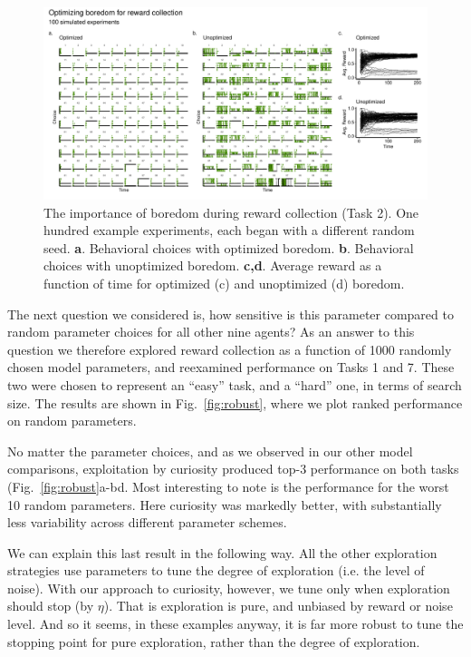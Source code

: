 \begin{figure}
	\begin{fullwidth}
	\includegraphics[width=1.0\linewidth]{img/boredom2.pdf} 
	\caption{The importance of boredom during reward collection (Task 2). One hundred example experiments, each began with a different random seed. 
	\textbf{a}. Behavioral choices with optimized boredom.
	\textbf{b}. Behavioral choices with unoptimized boredom.
	\textbf{c,d}. Average reward as a function of time for optimized (c) and unoptimized (d) boredom.
	}
	\label{fig:boredom2} 
	\end{fullwidth}
\end{figure}

The next question we considered is, how sensitive is this parameter compared to random parameter choices for all other nine agents? As an answer to this question we therefore explored reward collection as a function of 1000 randomly chosen model parameters, and reexamined performance on Tasks 1 and 7. These two were chosen to represent an ``easy'' task, and a ``hard'' one, in terms of search size. The results are shown in Fig.~\ref{fig:robust}, where we plot ranked performance on random parameters. 

No matter the parameter choices, and as we observed in our other model comparisons, exploitation by curiosity produced top-3 performance on both tasks (Fig.~\ref{fig:robust}a-bd. Most interesting to note is the performance for the worst 10 random parameters. Here curiosity was markedly better, with substantially less variability across different parameter schemes. 

We can explain this last result in the following way. All the other exploration strategies use parameters to tune the degree of exploration (i.e. the level of noise). With our approach to curiosity, however, we tune only when exploration should stop (by $\eta$). That is exploration is pure, and unbiased by reward or noise level. And so it seems, in these examples anyway, it is far more robust to tune the stopping point for pure exploration, rather than the degree of exploration.

